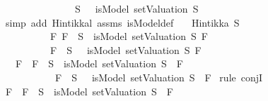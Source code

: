 \begin{isabellebody}
\ \ \ \ \ \ \ \ \ \ \ {\isasymand}\ {\isacharparenleft}\isactrlbold {\isasymnot}\ {\isasymbottom}\ {\isasymin}\ S\ {\isasymlongrightarrow}\ {\isacharparenleft}{\isasymnot}\ {\isacharparenleft}isModel\ {\isacharparenleft}setValuation\ S{\isacharparenright}\ {\isasymbottom}{\isacharparenright}{\isacharparenright}{\isacharparenright}{\isachardoublequoteclose}\isanewline
%
\isadelimproof
\ \ %
\endisadelimproof
%
\isatagproof
{}\isamarkupfalse%
\ {\isacharparenleft}simp\ add{\isacharcolon}\ Hintikka{\isacharunderscore}l{}\ assms\ isModel{\isacharunderscore}def{\isacharparenright}%
\endisatagproof
{\isafoldproof}%
%
\isadelimproof
\isanewline
%
\endisadelimproof
\isanewline
{}\isamarkupfalse%
\isanewline
\ \ \ {\isachardoublequoteopen}Hintikka\ S{\isachardoublequoteclose}\isanewline
\ \ \ \ \ \ \ \ \ \ {\isachardoublequoteopen}{\isasymAnd}F{\isachardot}\ {\isacharparenleft}F\ {\isasymin}\ S\ {\isasymlongrightarrow}\ isModel\ {\isacharparenleft}setValuation\ S{\isacharparenright}\ F{\isacharparenright}\ {\isasymand}\isanewline
\ \ \ \ \ \ \ \ \ {\isacharparenleft}\isactrlbold {\isasymnot}\ F\ {\isasymin}\ S\ {\isasymlongrightarrow}\ {\isasymnot}\ isModel\ {\isacharparenleft}setValuation\ S{\isacharparenright}\ F{\isacharparenright}{\isachardoublequoteclose}\isanewline
\ \ \ {\isachardoublequoteopen}{\isasymAnd}F{\isachardot}\ {\isacharparenleft}\isactrlbold {\isasymnot}\ F\ {\isasymin}\ S\ {\isasymlongrightarrow}\ isModel\ {\isacharparenleft}setValuation\ S{\isacharparenright}\ {\isacharparenleft}\isactrlbold {\isasymnot}\ F{\isacharparenright}{\isacharparenright}\ {\isasymand}\isanewline
\ \ \ \ \ \ \ \ \ {\isacharparenleft}\isactrlbold {\isasymnot}\ {\isacharparenleft}\isactrlbold {\isasymnot}\ F{\isacharparenright}\ {\isasymin}\ S\ {\isasymlongrightarrow}\ {\isasymnot}\ isModel\ {\isacharparenleft}setValuation\ S{\isacharparenright}\ {\isacharparenleft}\isactrlbold {\isasymnot}\ F{\isacharparenright}{\isacharparenright}{\isachardoublequoteclose}\isanewline
%
\isadelimproof
%
\endisadelimproof
%
\isatagproof
{}\isamarkupfalse%
\ {\isacharparenleft}rule\ conjI{\isacharparenright}\ \isanewline
\ \ \isamarkupfalse%
\ {\isachardoublequoteopen}{\isasymAnd}F{\isachardot}\ \isactrlbold {\isasymnot}\ F\ {\isasymin}\ S\ {\isasymlongrightarrow}\ isModel\ {\isacharparenleft}setValuation\ S{\isacharparenright}\ {\isacharparenleft}\isactrlbold {\isasymnot}\ F{\isacharparenright}{\isachardoublequoteclose}\isanewline
\ \ \isamarkupfalse%
\ \isanewline

\end{isabellebody}
